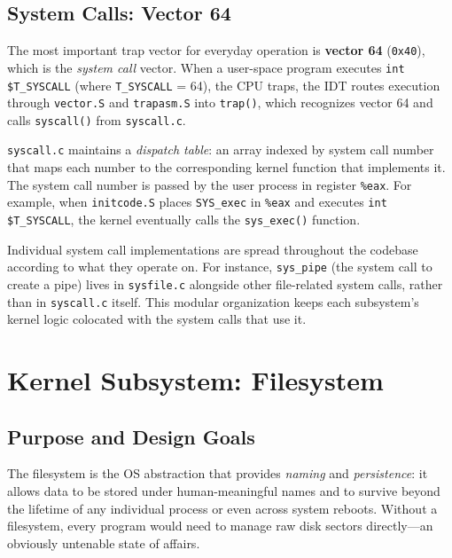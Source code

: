 \documentclass[11pt]{article}
\begin{document}
\subsection{System Calls: Vector 64}

The most important trap vector for everyday operation is \textbf{vector 64} (\texttt{0x40}), which is the \emph{system call} vector. When a user-space program executes \texttt{int \$T\_SYSCALL} (where \texttt{T\_SYSCALL} = 64), the CPU traps, the IDT routes execution through \texttt{vector.S} and \texttt{trapasm.S} into \texttt{trap()}, which recognizes vector 64 and calls \texttt{syscall()} from \texttt{syscall.c}.

\texttt{syscall.c} maintains a \emph{dispatch table}: an array indexed by system call number that maps each number to the corresponding kernel function that implements it. The system call number is passed by the user process in register \texttt{\%eax}. For example, when \texttt{initcode.S} places \texttt{SYS\_exec} in \texttt{\%eax} and executes \texttt{int \$T\_SYSCALL}, the kernel eventually calls the \texttt{sys\_exec()} function.

Individual system call implementations are spread throughout the codebase according to what they operate on. For instance, \texttt{sys\_pipe} (the system call to create a pipe) lives in \texttt{sysfile.c} alongside other file-related system calls, rather than in \texttt{syscall.c} itself. This modular organization keeps each subsystem's kernel logic colocated with the system calls that use it.

\section{Kernel Subsystem: Filesystem}

\subsection{Purpose and Design Goals}

The filesystem is the OS abstraction that provides \emph{naming} and \emph{persistence}: it allows data to be stored under human-meaningful names and to survive beyond the lifetime of any individual process or even across system reboots. Without a filesystem, every program would need to manage raw disk sectors directly---an obviously untenable state of affairs.
\end{document}
